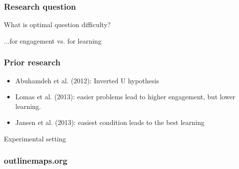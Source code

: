 \documentclass[bigger]{beamer}
\begin{document}
\begin{frame}
  \frametitle{Research question}
	\begin{center}
    {\Huge What is optimal question difficulty?} 

		\bigskip
    {\Huge ...for engagement vs. for learning}
	\end{center}
\end{frame}

\begin{frame}
	\frametitle{Prior research}
	\begin{itemize}
	  \item Abuhamdeh et al. (2012): Inverted U hypothesis
	  \item Lomas et al. (2013): easier problems lead to higher engagement, but lower learning.
	  \item Jansen et al. (2013): easiest condition leads to the best learning
	\end{itemize}
\end{frame}

\begin{frame}
	\begin{center}
    {\Huge Experimental setting} 
	\end{center}
\end{frame}

\begin{frame}
  \frametitle{outlinemaps.org}
	\noindent{}
\end{frame}
\end{document}
